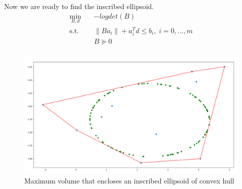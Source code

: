 \documentclass[12pt]{article}%
\begin{document}
Now we are ready to find the inscribed ellipsoid. 
\begin{equation}\label{max_volume}
\begin{aligned}
\min_{B,d} \quad & -log det(B)\\
\textrm{s.t.} \quad &\left \| Ba_i \right \| + a_i^Td \leq b_i, \; i=0,...,m \\
  & B \succeq 0\\
\end{aligned}
\end{equation} 




\begin{figure}[H]
    \begin{center}
    \includegraphics[width=12cm]{min_volume.png}
    \caption{Maximum volume that encloses an inscribed ellipsoid of convex hull}\label{f:min_volume}
    \end{center}
\end{figure}

\printbibliography
\end{document}
